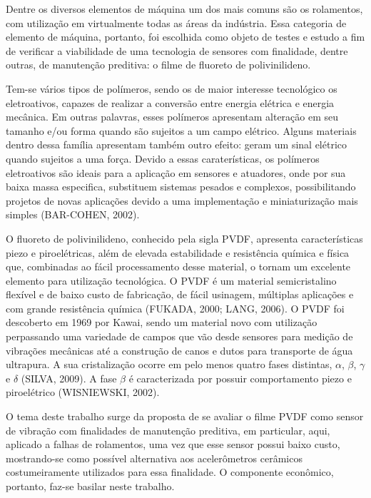 \documentclass[
	12pt,				
	oneside,			
	a4paper,			
	english,			
	brazil,	
	sumario=abnt-6027-2012		
	]{abntex2ppgsi}
\begin{document}
Dentre os diversos elementos de máquina um dos mais comuns são os rolamentos, com utilização em virtualmente todas as áreas da indústria. Essa categoria de elemento de máquina, portanto, foi escolhida como objeto de testes e estudo a fim de verificar a viabilidade de uma tecnologia  de sensores com finalidade, dentre outras, de manutenção preditiva: o filme de fluoreto de polivinilideno. 

Tem-se vários tipos de polímeros, sendo os de maior interesse tecnológico os eletroativos, capazes de realizar a conversão entre energia elétrica e energia mecânica. Em outras palavras, esses polímeros apresentam alteração em seu tamanho e/ou forma quando são sujeitos a um campo elétrico. Alguns  materiais dentro dessa família apresentam também outro efeito: geram um sinal elétrico quando sujeitos a uma força. Devido a essas caraterísticas, os polímeros eletroativos são ideais para a aplicação em sensores e atuadores, onde por sua baixa massa especifica, substituem sistemas pesados e complexos, possibilitando projetos de novas aplicações devido a uma implementação e miniaturização mais simples (BAR-COHEN, 2002).

O fluoreto de polivinilideno, conhecido pela sigla PVDF, apresenta características piezo e piroelétricas, além de elevada estabilidade e resistência química e física que, combinadas ao fácil processamento desse material, o tornam um excelente elemento para utilização tecnológica. O PVDF é um material semicristalino flexível e de baixo custo de fabricação, de fácil usinagem, múltiplas aplicações e com grande resistência química (FUKADA, 2000; LANG, 2006). O PVDF foi descoberto em 1969 por Kawai, sendo um material novo com utilização perpassando uma variedade de campos que vão desde sensores para medição de vibrações mecânicas até a construção de canos e dutos para transporte de água ultrapura. A sua cristalização ocorre em pelo menos quatro fases distintas, $\alpha$, $\beta$, $\gamma$ e $\delta$ (SILVA, 2009). A fase $\beta$ é caracterizada por possuir comportamento piezo e piroelétrico (WISNIEWSKI, 2002).

O tema deste trabalho surge da proposta de se avaliar o filme PVDF como sensor de vibração com finalidades de manutenção preditiva, em particular, aqui, aplicado a falhas de rolamentos, uma vez que esse sensor possui baixo custo, mostrando-se como possível alternativa aos acelerômetros cerâmicos costumeiramente utilizados para essa finalidade. O componente econômico, portanto, faz-se basilar neste trabalho. 
\end{document}
